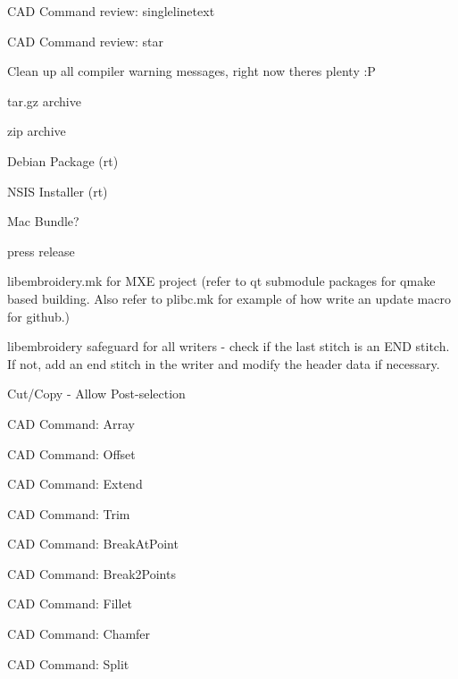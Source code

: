 \begin{DoxyRefList}
CAD Command review\+: singlelinetext 



CAD Command review\+: star 



Clean up all compiler warning messages, right now theres plenty \+:P

\label{todo__todo000007}%
%
tar.\+gz archive 



zip archive 



Debian Package (rt) 



NSIS Installer (rt) 



Mac Bundle? 



press release

\label{todo__todo000008}%
%
libembroidery.\+mk for MXE project (refer to qt submodule packages for qmake based building. Also refer to plibc.\+mk for example of how write an update macro for github.) 



libembroidery safeguard for all writers -\/ check if the last stitch is an END stitch. If not, add an end stitch in the writer and modify the header data if necessary. 



Cut/\+Copy -\/ Allow Post-\/selection 



CAD Command\+: Array 



CAD Command\+: Offset 



CAD Command\+: Extend 



CAD Command\+: Trim 



CAD Command\+: Break\+At\+Point 



CAD Command\+: Break2\+Points 



CAD Command\+: Fillet 



CAD Command\+: Chamfer 



CAD Command\+: Split 




\end{DoxyRefList}
